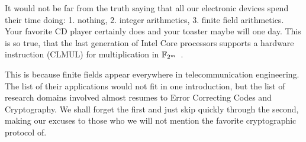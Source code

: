 




It would not be far from the truth saying that all our electronic
devices spend their time doing: 1. nothing, 2. integer arithmetics, 3.
finite field arithmetics. Your favorite CD player certainly does and
your toaster maybe will one day. This is so true, that the last
generation of Intel Core processors supports a hardware instruction
(CLMUL) for multiplication in $\mathbb{F}_{2^m}$~\cite{intel-carryless}.

This is because finite fields appear everywhere in telecommunication
engineering. The list of their applications would not fit in one
introduction, but the list of research domains involved almost resumes
to Error Correcting Codes and Cryptography.  We shall forget the first
and just skip quickly through the second, making our excuses to those
who we will not mention the favorite cryptographic protocol of.

